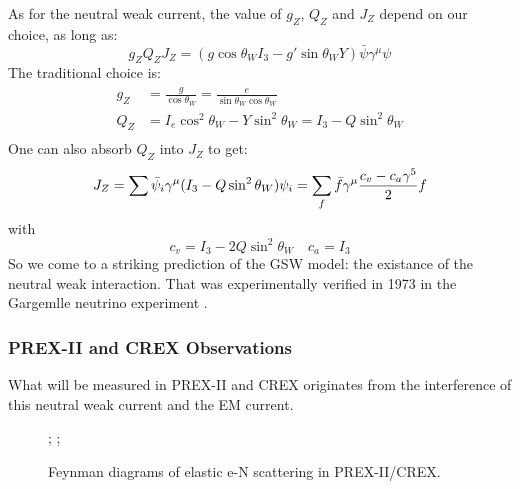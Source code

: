 As for the neutral weak current, the value of $g_Z$, $Q_Z$ and $J_Z$ depend on our choice, 
as long as:
\begin{equation}
    g_Z Q_Z J_Z = (g\cos\theta_W I_3 - g'\sin\theta_W Y)\bar{\psi}\gamma^\mu\psi 
\end{equation}
The traditional choice is:
\begin{equation}
    \begin{aligned}
	g_Z &= \frac{g}{\cos\theta_W} = \frac{e}{\sin\theta_W\cos\theta_W}  \\
	Q_Z &= I_e\cos^2\theta_W - Y\sin^2\theta_W = I_3 - Q\sin^2\theta_W  \\
    \end{aligned}
\end{equation}
One can also absorb $Q_Z$ into $J_Z$ to get:
\begin{equation}
    J_Z = \sum \bar{\psi}_i\gamma^\mu (I_3 - Q\sin^2\theta_W)\psi_i
	= \sum_f \bar{f}\gamma^\mu\frac{c_v - c_a\gamma^5}{2} f \\
\end{equation}
with 
\begin{equation}
    c_v = I_3 - 2Q\sin^2\theta_W    \quad c_a = I_3
\end{equation}
So we come to a striking prediction of the GSW model: the existance of the neutral weak interaction.
That was experimentally verified in 1973 in the Gargemlle neutrino experiment \cite{HASERT19741}.

\subsubsection{PREX-II and CREX Observations}
What will be measured in PREX-II and CREX originates from the
interference of this neutral weak current and the EM current.

\begin{figure}[!h]
    \centering
{};
;
    \caption{Feynman diagrams of elastic e-N scattering in PREX-II/CREX.}
\end{figure}

